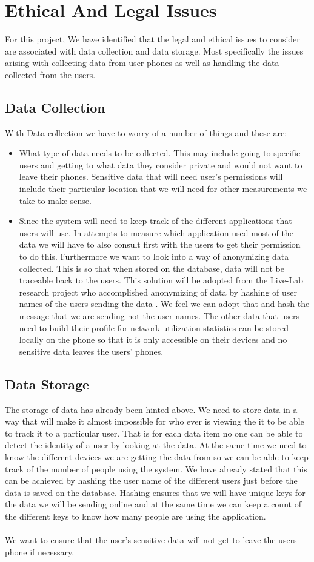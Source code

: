\section{Ethical And Legal Issues}
For this project, We have identified that the legal and ethical issues to consider are associated with data collection and data storage. Most specifically the issues arising with collecting data from user phones as well as handling the data collected from the users.

\subsection*{Data Collection}
With Data collection we have to worry of a number of things and these are:
\begin{itemize}
	\item What type of data needs to be collected. This may include going to specific users and getting to what data they consider private and would not want to leave their phones. Sensitive data that will need user's permissions will include their particular location that we will need for other measurements we take to make sense. 
	\item Since the system will need to keep track of the different applications that users will use. In attempts to measure which application used most of the data we will have to also consult first with the users to get their permission to do this. Furthermore we want to look into a way of anonymizing data collected. This is so that when stored on the database, data will not be traceable back to the users. This solution will be adopted from the Live-Lab research project who accomplished anonymizing of data by hashing of user names of the users sending the data \cite{Shepard:2011:LMW:1925019.1925023}. We feel we can adopt that and hash the message that we are sending not the user names. The other data that users need to build their profile for network utilization statistics can be stored locally on the phone so that it is only accessible on their devices and no sensitive data leaves the users' phones.
\end{itemize}
\subsection*{Data Storage}
The storage of data has already been hinted above. We need to store data in a way that will make it almost impossible for who ever is viewing the it to be able to track it to a particular user. That is for each data item no one can be able to detect the identity of a user by looking at the data. At the same time we need to know the different devices we are getting the data from so we can be able to keep track of the number of people using the system. We have already stated that this can be achieved by hashing the user name of the different users just before the data is saved on the database. Hashing ensures that we will have unique keys for the data we will be sending online and at the same time we can keep a count of the different keys to know how many people are using the application.

\paragraph{}
We want to ensure that the user's sensitive data will not get to leave the users phone if necessary. 
